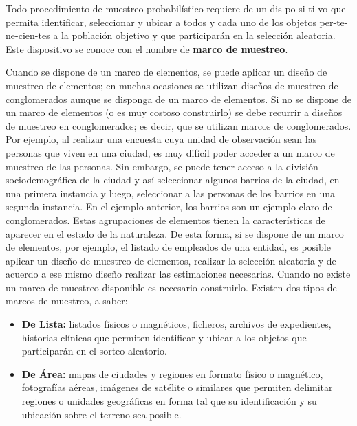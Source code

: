 \documentclass[
  12pt,
  spanish,
]{book}
\begin{document}
Todo procedimiento de muestreo probabilístico requiere de un dis-po-si-ti-vo que permita identificar, seleccionar y ubicar a todos y cada uno de los objetos per-te-ne-cien-tes a la población objetivo y que participarán en la selección aleatoria. Este dispositivo se conoce con el nombre de \textbf{marco de muestreo}.

Cuando se dispone de un marco de elementos, se puede aplicar un diseño de muestreo de elementos; en muchas ocasiones se utilizan diseños de muestreo de conglomerados aunque se disponga de un marco de elementos. Si no se dispone de un marco de elementos (o es muy costoso construirlo) se debe recurrir a diseños de muestreo en conglomerados; es decir, que se utilizan marcos de conglomerados. Por ejemplo, al realizar una encuesta cuya unidad de observación sean las personas que viven en una ciudad, es muy difícil poder acceder a un marco de muestreo de las personas. Sin embargo, se puede tener acceso a la división sociodemográfica de la ciudad y así seleccionar algunos barrios de la ciudad, en una primera instancia y luego, seleccionar a las personas de los barrios en una segunda instancia. En el ejemplo anterior, los barrios son un ejemplo claro de conglomerados. Estas agrupaciones de elementos tienen la características de aparecer en el estado de la naturaleza. De esta forma, si se dispone de un marco de elementos, por ejemplo, el listado de empleados de una entidad, es posible aplicar un diseño de muestreo de elementos, realizar la selección aleatoria y de acuerdo a ese mismo diseño realizar las estimaciones necesarias. Cuando no existe un marco de muestreo disponible es necesario construirlo. Existen dos tipos de marcos de muestreo, a saber:

\begin{itemize}
\item \textbf{De Lista:} listados físicos o magnéticos, ficheros, archivos de ex\-pe\-dien\-tes, historias clínicas que permiten identificar y ubicar a los objetos que participarán en el sorteo aleatorio.
\item \textbf{De Área:} mapas de ciudades y regiones en formato físico o magnético, fotografías aéreas, imágenes de satélite o similares que permiten delimitar regiones o unidades geográficas en forma tal que su identificación y su ubicación sobre el terreno sea posible.
\end{itemize}
\end{document}
